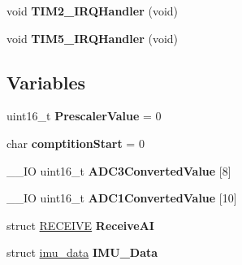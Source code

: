 \begin{DoxyCompactItemize}
\item 
\hypertarget{group___t_i_m___p_w_m___output_ga38ad4725462bdc5e86c4ead4f04b9fc2}{}void {\bfseries T\+I\+M2\+\_\+\+I\+R\+Q\+Handler} (void)\label{group___t_i_m___p_w_m___output_ga38ad4725462bdc5e86c4ead4f04b9fc2}

\item 
\hypertarget{group___t_i_m___p_w_m___output_ga5e66446caf21dd90191dc07a13ce2378}{}void {\bfseries T\+I\+M5\+\_\+\+I\+R\+Q\+Handler} (void)\label{group___t_i_m___p_w_m___output_ga5e66446caf21dd90191dc07a13ce2378}

\end{DoxyCompactItemize}
\subsection*{Variables}
\begin{DoxyCompactItemize}
\item 
\hypertarget{group___t_i_m___p_w_m___output_ga926539c31db1b9beef91893c9e44fd20}{}uint16\+\_\+t {\bfseries Prescaler\+Value} = 0\label{group___t_i_m___p_w_m___output_ga926539c31db1b9beef91893c9e44fd20}

\item 
\hypertarget{group___t_i_m___p_w_m___output_ga709c2e511084ca949f26727b19f29b11}{}char {\bfseries comptition\+Start} = 0\label{group___t_i_m___p_w_m___output_ga709c2e511084ca949f26727b19f29b11}

\item 
\hypertarget{group___t_i_m___p_w_m___output_gabe7ede2fbcc662ffaedfeee7b166c551}{}\+\_\+\+\_\+\+I\+O uint16\+\_\+t {\bfseries A\+D\+C3\+Converted\+Value} \mbox{[}8\mbox{]}\label{group___t_i_m___p_w_m___output_gabe7ede2fbcc662ffaedfeee7b166c551}

\item 
\hypertarget{group___t_i_m___p_w_m___output_gabeff3cfe2fc9ac73411736b0cb5686ce}{}\+\_\+\+\_\+\+I\+O uint16\+\_\+t {\bfseries A\+D\+C1\+Converted\+Value} \mbox{[}10\mbox{]}\label{group___t_i_m___p_w_m___output_gabeff3cfe2fc9ac73411736b0cb5686ce}

\item 
\hypertarget{group___t_i_m___p_w_m___output_ga0f816e7c79676e73c6658d3b0ccab8fc}{}struct \hyperlink{struct_r_e_c_e_i_v_e}{R\+E\+C\+E\+I\+V\+E} {\bfseries Receive\+A\+I}\label{group___t_i_m___p_w_m___output_ga0f816e7c79676e73c6658d3b0ccab8fc}

\item 
\hypertarget{group___t_i_m___p_w_m___output_ga73f99ca67d11034be97deb0e78829394}{}struct \hyperlink{structimu__data}{imu\+\_\+data} {\bfseries I\+M\+U\+\_\+\+Data}\label{group___t_i_m___p_w_m___output_ga73f99ca67d11034be97deb0e78829394}

\end{DoxyCompactItemize}


